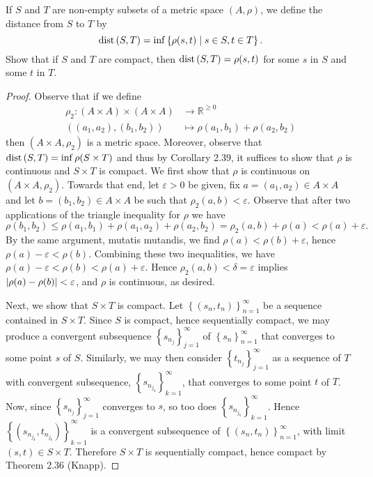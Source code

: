 \documentclass[12pt]{amsart}
\begin{document}
\begin{ex3}
  If $S$ and $T$ are non-empty subsets of a metric space $(A,\rho)$, we define the distance from $S$ to $T$ by
  $$ \operatorname{dist}\left(S,T\right) = \inf \left\{\rho(s,t) \;\middle\vert\; s \in S, t \in T\right\}.$$
  Show that if $S$ and $T$ are compact, then $\operatorname{dist}\left(S,T\right) = \rho(s,t)$ for some $s$ in $S$ and some $t$ in $T$.

  \begin{proof}
    Observe that if we define 
    \begin{align*}
      \rho_2: \left(A \times A\right) \times \left(A \times A\right) &\rightarrow \mathbb{R}^{\geq 0}\\
      ((a_1, a_2), (b_1, b_2)) &\mapsto \rho(a_1, b_1) + \rho(a_2, b_2)
    \end{align*}
    then $(A \times A, \rho_2)$ is a metric space.
    Moreover, observe that $\operatorname{dist}\left(S,T\right) = \inf \rho(S \times T)$ and thus by Corollary 2.39, it suffices to show that $\rho$ is continuous and $S\times T$ is compact.
    We first show that $\rho$ is continuous on $(A \times A, \rho_2)$.
    Towards that end, let $\varepsilon > 0$ be given, fix $a = (a_1, a_2) \in A \times A$ and let $b = (b_1,b_2) \in A \times A$ be such that $\rho_2(a,b) < \varepsilon$.
    Observe that after two applications of the triangle inequality for $\rho$ we have 
    $$\rho(b_1, b_2) \leq \rho(a_1, b_1) + \rho(a_1, a_2) + \rho(a_2, b_2) = \rho_2(a,b) + \rho(a) < \rho(a) + \varepsilon.$$
    By the same argument, mutatis mutandis, we find $\rho(a) < \rho(b) + \varepsilon$, hence $\rho(a) - \varepsilon < \rho(b)$.
    Combining these two inequalities, we have $\rho(a) - \varepsilon < \rho(b) < \rho(a) + \varepsilon$.
    Hence $\rho_2(a,b) < \delta = \varepsilon$ implies $\left| \rho(a) - \rho(b) \right| < \varepsilon$, and $\rho$ is continuous, as desired.
    
    Next, we show that $S \times T$ is compact.
    Let $\left\{ \left(s_n, t_n\right) \right\}_{n=1}^{\infty}$ be a sequence contained in $S \times T$.
    Since $S$ is compact, hence sequentially compact, we may produce a convergent subsequence $\left\{s_{n_j}\right\}_{j=1}^{\infty}$ of $\left\{s_n\right\}_{n=1}^{\infty}$ that converges to some point $s$ of $S$.
    Similarly, we may then consider $\left\{t_{n_j}\right\}_{j=1}^{\infty}$ as a sequence of $T$ with convergent subsequence, $\left\{s_{n_{j_k}}\right\}_{k=1}^{\infty}$, that converges to some point $t$ of $T$.
    Now, since $\left\{s_{n_j}\right\}_{j=1}^{\infty}$ converges to $s$, so too does $\left\{s_{n_{j_k}}\right\}_{k=1}^{\infty}$.
    Hence $\left\{ \left(s_{n_{j_k}}, t_{n_{j_k}}\right) \right\}_{k=1}^{\infty}$ is a convergent subsequence of $\left\{ \left(s_n, t_n\right) \right\}_{n=1}^{\infty}$, with limit $(s,t) \in S \times T$.
    Therefore $S \times T$ is sequentially compact, hence compact by Theorem 2.36 (Knapp).
  \end{proof}
\end{ex3}
\end{document}
